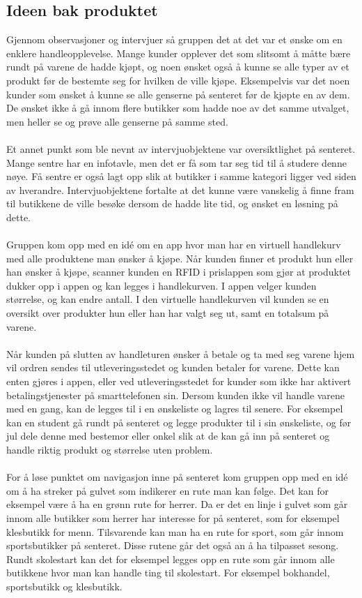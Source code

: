 \subsection{Ideen bak produktet}
Gjennom observasjoner og intervjuer så gruppen det at det var et ønske om en enklere handleopplevelse. Mange kunder opplever det som slitsomt å måtte bære rundt på varene de hadde kjøpt, og noen ønsket også å kunne se alle typer av et produkt før de bestemte seg for hvilken de ville kjøpe. Eksempelvis var det noen kunder som ønsket å kunne se alle genserne på senteret før de kjøpte en av dem. De ønsket ikke å gå innom flere butikker som hadde noe av det samme utvalget, men heller se og prøve alle genserne på samme sted.
\\\\
Et annet punkt som ble nevnt av intervjuobjektene var oversiktlighet på senteret. Mange sentre har en infotavle, men det er få som tar seg tid til å studere denne nøye. Få sentre er også lagt opp slik at butikker i samme kategori ligger ved siden av hverandre. Intervjuobjektene fortalte at det kunne være vanskelig å finne fram til butikkene de ville besøke dersom de hadde lite tid, og ønsket en løsning på dette. 
\\\\
Gruppen kom opp med en idé om en app hvor man har en virtuell handlekurv med alle produktene man ønsker å kjøpe. Når kunden finner et produkt hun eller han ønsker å kjøpe, scanner kunden en RFID i prislappen som gjør at produktet dukker opp i appen og kan legges i handlekurven. I appen velger kunden størrelse, og kan endre antall. I den virtuelle handlekurven vil kunden se en oversikt over produkter hun eller han har valgt seg ut, samt en totalsum på varene. 
\\\\	
Når kunden på slutten av handleturen ønsker å betale og ta med seg varene hjem vil ordren sendes til utleveringsstedet og kunden betaler for varene. Dette kan enten gjøres i appen, eller ved utleveringsstedet for kunder som ikke har aktivert betalingstjenester på smarttelefonen sin. Dersom kunden ikke vil handle varene med en gang, kan de legges til i en ønskeliste og lagres til senere. For eksempel kan en student gå rundt på senteret og legge produkter til i sin ønskeliste, og før jul dele denne med bestemor eller onkel slik at de kan gå inn på senteret og handle riktig produkt og størrelse uten problem.
\\\\
For å løse punktet om navigasjon inne på senteret kom gruppen opp med en idé om å ha streker på gulvet som indikerer en rute man kan følge. Det kan for eksempel være å ha en grønn rute for herrer. Da er det en linje i gulvet som går innom alle butikker som herrer har interesse for på senteret, som for eksempel klesbutikk for menn. Tilsvarende kan man ha en rute for sport, som går innom sportsbutikker på senteret. Disse rutene går det også an å ha tilpasset sesong. Rundt skolestart kan det for eksempel legges opp en rute som går innom alle butikkene hvor man kan handle ting til skolestart. For eksempel bokhandel, sportsbutikk og klesbutikk.


